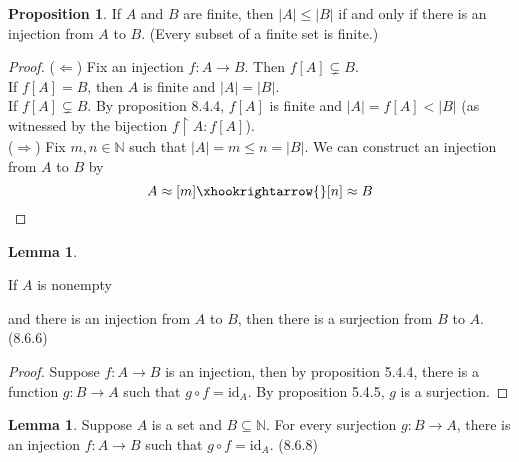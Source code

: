 \documentclass[14pt]{article}
\theoremstyle{definition}
\newtheorem{proposition}[definition]{Proposition}
\newtheorem{lemma}[definition]{Lemma}
\newcommand{\fun}[3]{#1\colon #2\rightarrow#3}
\newcommand{\bb}[1]{\mathbb{#1}}
\newcommand{\restrict}{\upharpoonright}
\begin{document}
\begin{proposition}
    If $A$ and $B$ are finite, then $|A|\leq|B|$ if and only if there is an injection from $A$ to $B$. (Every subset of a finite set is finite.)
\end{proposition}
\begin{proof}
    ($\Leftarrow$) Fix an injection $\fun{f}{A}{B}$. Then $f[A]\subsetneq B$. \\
    If $f[A]=B$, then $A$ is finite and $|A|=|B|$.\\
    If $f[A]\subsetneq B$. By proposition 8.4.4, $f[A]$ is finite and $|A|=f[A]<|B|$ (as witnessed by the bijection $f\restrict A \colon f[A]$).\\
    ($\Rightarrow$) Fix $m,n\in \bb{N}$ such that $|A|=m\leq n=|B|$. We can construct an injection
    from $A$ to $B$ by
    \begin{equation*}
        A\approx [m] \xhookrightarrow{} [n]\approx B
    \end{equation*}
\end{proof}

\vspace{2mm}
\begin{lemma}
    \hypertarget{Lemma 8.4.6}{If $A$ is nonempty} and there is an injection from $A$ to $B$, then there is a surjection from $B$ to $A$. (8.6.6)
\end{lemma}
\begin{proof}
    Suppose $\fun{f}{A}{B}$ is an injection, then by proposition 5.4.4, there is a function
    $\fun{g}{B}{A}$ such that $g\circ f=\mathrm{id}_A$. By proposition 5.4.5, $g$ is a surjection.
\end{proof}
\vspace{2mm}

\begin{lemma}
    Suppose $A$ is a set and $B\subseteq \bb{N}$. For every surjection $\fun{g}{B}{A}$, 
    there is an injection $\fun{f}{A}{B}$ such that $g\circ f=\mathrm{id}_A$. (8.6.8)
\end{lemma}
\end{document}
